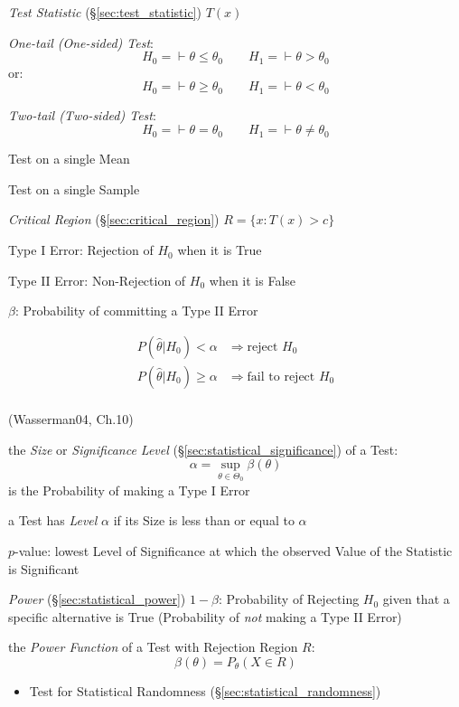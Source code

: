 \emph{Test Statistic} (\S\ref{sec:test_statistic}) $T(x)$

\emph{One-tail (One-sided) Test}:
\[
  H_0 = \vdash \theta \leq \theta_0 \quad\quad H_1 = \vdash \theta > \theta_0
\]
or:
\[
  H_0 = \vdash \theta \geq \theta_0 \quad\quad H_1 = \vdash \theta < \theta_0
\]

\emph{Two-tail (Two-sided) Test}:
\[
  H_0 = \vdash \theta = \theta_0 \quad\quad H_1 = \vdash \theta \neq \theta_0
\]

Test on a single Mean

Test on a single Sample

\emph{Critical Region} (\S\ref{sec:critical_region}) $R = \{ x : T(x) > c \}$

Type I Error: Rejection of $H_0$ when it is True

Type II Error: Non-Rejection of $H_0$ when it is False

$\beta$: Probability of committing a Type II Error

\begin{align*}
  P(\hat{\theta} | H_0) < \alpha & \Rightarrow \text{reject } H_0 \\
  P(\hat{\theta} | H_0) \geq \alpha & \Rightarrow \text{fail to reject } H_0 \\
\end{align*}

(Wasserman04, Ch.10)

the \emph{Size} or \emph{Significance Level}
(\S\ref{sec:statistical_significance}) of a Test:
\[
  \alpha = \sup_{\theta \in \Theta_0} \beta(\theta)
\]
is the Probability of making a Type I Error

a Test has \emph{Level} $\alpha$ if its Size is less than or equal to $\alpha$

$p$-value: lowest Level of Significance at which the observed Value of
the Statistic is Significant

\emph{Power} (\S\ref{sec:statistical_power}) $1 - \beta$: Probability of
Rejecting $H_0$ given that a specific alternative is True (Probability of
\emph{not} making a Type II Error)

the \emph{Power Function} of a Test with Rejection Region $R$:
\[
  \beta(\theta) = P_\theta(X \in R)
\]

\begin{itemize}
  \item Test for Statistical Randomness (\S\ref{sec:statistical_randomness})
\end{itemize}

